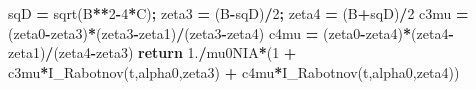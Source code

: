 \documentclass[
  a4paper,
  numbers=noendperiod,
  DIV=12]{scrreprt}
\newenvironment{Shaded}{\begin{snugshade}}{\end{snugshade}}
\newcommand{\ControlFlowTok}[1]{\textcolor[rgb]{0.13,0.29,0.53}{\textbf{#1}}}
\newcommand{\DecValTok}[1]{\textcolor[rgb]{0.00,0.00,0.81}{#1}}
\newcommand{\FloatTok}[1]{\textcolor[rgb]{0.00,0.00,0.81}{#1}}
\newcommand{\NormalTok}[1]{#1}
\newcommand{\OperatorTok}[1]{\textcolor[rgb]{0.81,0.36,0.00}{\textbf{#1}}}
\begin{document}
\begin{Shaded}
\begin{Highlighting}[]
\NormalTok{    sqD }\OperatorTok{=}\NormalTok{ sqrt(B}\OperatorTok{**}\DecValTok{2}\OperatorTok{{-}}\DecValTok{4}\OperatorTok{*}\NormalTok{C)}\OperatorTok{;}\NormalTok{  zeta3 }\OperatorTok{=}\NormalTok{ (B}\OperatorTok{{-}}\NormalTok{sqD)}\OperatorTok{/}\DecValTok{2}\OperatorTok{;}\NormalTok{  zeta4 }\OperatorTok{=}\NormalTok{ (B}\OperatorTok{+}\NormalTok{sqD)}\OperatorTok{/}\DecValTok{2}
\NormalTok{    c3mu }\OperatorTok{=}\NormalTok{ (zeta0}\OperatorTok{{-}}\NormalTok{zeta3)}\OperatorTok{*}\NormalTok{(zeta3}\OperatorTok{{-}}\NormalTok{zeta1)}\OperatorTok{/}\NormalTok{(zeta3}\OperatorTok{{-}}\NormalTok{zeta4)}
\NormalTok{    c4mu }\OperatorTok{=}\NormalTok{ (zeta0}\OperatorTok{{-}}\NormalTok{zeta4)}\OperatorTok{*}\NormalTok{(zeta4}\OperatorTok{{-}}\NormalTok{zeta1)}\OperatorTok{/}\NormalTok{(zeta4}\OperatorTok{{-}}\NormalTok{zeta3)}
    \ControlFlowTok{return} \FloatTok{1.}\OperatorTok{/}\NormalTok{mu0NIA}\OperatorTok{*}\NormalTok{(}\DecValTok{1} \OperatorTok{+}\NormalTok{ c3mu}\OperatorTok{*}\NormalTok{I\_Rabotnov(t,alpha0,zeta3) }\OperatorTok{+}\NormalTok{ c4mu}\OperatorTok{*}\NormalTok{I\_Rabotnov(t,alpha0,zeta4))}


\end{Highlighting}
\end{Shaded}
\end{document}
